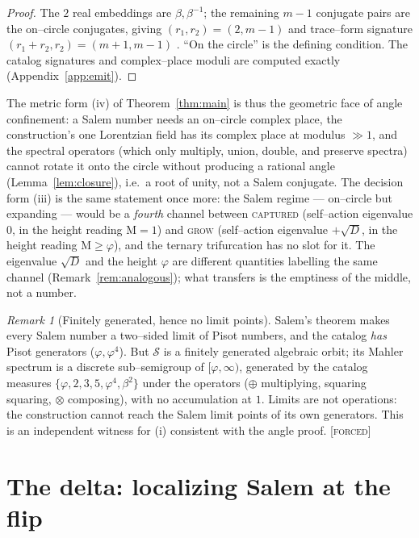 \documentclass[11pt]{article}
\theoremstyle{plain}
\theoremstyle{definition}
\theoremstyle{remark}
\newtheorem{remark}[theorem]{Remark}
\newcommand{\forced}{\textcolor{forcedc}{\textsc{[forced]}}}
\newcommand{\Mah}{\mathrm{M}}
\newcommand{\Scal}{\mathcal{S}}
\begin{document}
\begin{proof}
The $2$ real embeddings are $\beta,\beta^{-1}$; the remaining $m-1$ conjugate pairs are the on--circle conjugates, giving $(r_1,r_2)=(2,m-1)$ and trace--form signature $(r_1+r_2,r_2)=(m+1,m-1)$ \cite{LSW,Smyth}. ``On the circle'' is the defining condition. The catalog signatures and complex--place moduli are computed exactly (Appendix~\ref{app:emit}). \end{proof}

The metric form (iv) of Theorem~\ref{thm:main} is thus the geometric face of angle confinement: a Salem number needs an on--circle complex place, the construction's one Lorentzian field has its complex place at modulus $\gg1$, and the spectral operators (which only multiply, union, double, and preserve spectra) cannot rotate it onto the circle without producing a rational angle (Lemma~\ref{lem:closure}), i.e.\ a root of unity, not a Salem conjugate. The decision form (iii) is the same statement once more: the Salem regime --- on--circle but expanding --- would be a \emph{fourth} channel between \textsc{captured} (self--action eigenvalue $0$, in the height reading $\Mah=1$) and \textsc{grow} (self--action eigenvalue $+\sqrt D$, in the height reading $\Mah\ge\varphi$), and the ternary trifurcation has no slot for it. The eigenvalue $\sqrt D$ and the height $\varphi$ are different quantities labelling the same channel (Remark~\ref{rem:analogous}); what transfers is the emptiness of the middle, not a number.

\begin{remark}[Finitely generated, hence no limit points]\label{rem:fg}
Salem's theorem makes every Salem number a two--sided limit of Pisot numbers, and the catalog \emph{has} Pisot generators ($\varphi,\varphi^4$). But $\Scal$ is a finitely generated algebraic orbit; its Mahler spectrum is a discrete sub--semigroup of $[\varphi,\infty)$, generated by the catalog measures $\{\varphi,2,3,5,\varphi^4,\beta^2\}$ under the operators ($\oplus$ multiplying, squaring squaring, $\otimes$ composing), with no accumulation at $1$. Limits are not operations: the construction cannot reach the Salem limit points of its own generators. This is an independent witness for (i) consistent with the angle proof. \forced
\end{remark}

\section{The delta: localizing Salem at the flip}\label{sec:residual}
\end{document}

